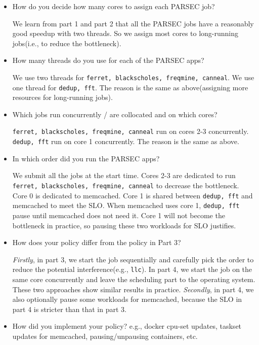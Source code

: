 \documentclass[11pt]{article}
\begin{document}
\begin{enumerate}
\begin{itemize}
        \item How do you decide how many cores to assign each PARSEC job? 

        We learn from part 1 and part 2 that all the PARSEC jobs have a reasonably good speedup
        with two threads. So we assign most cores to long-running jobs(i.e., to reduce the bottleneck).

        \item How many threads do you use for each of the PARSEC apps? 

        We use two threads for \texttt{ferret, blackscholes, freqmine, canneal}. 
        We use one thread for \texttt{dedup, fft}. The reason is the same as above(assigning more resources for long-running jobs).
        \item Which jobs run concurrently / are collocated and on which cores? 
       
       \texttt{ferret, blackscholes, freqmine, canneal} run on cores 2-3 concurrently.
       \texttt{dedup, fft} run on core 1 concurrently. The reason is the same as above.

        \item In which order did you run the PARSEC apps? 

        We submit all the jobs at the start time. Cores 2-3 are dedicated to run \texttt{ferret, blackscholes, freqmine, canneal} to decrease the bottleneck.
        Core 0 is dedicated to memcached. Core 1 is shared between \texttt{dedup, fft} and memcached to meet the SLO.
        When memcached uses core 1, \texttt{dedup, fft} pause until memcached does not need it.
        Core 1 will not become the bottleneck in practice, so pausing these two workloads for SLO justifies. 

        \item How does your policy differ from the policy in Part 3? 

        \emph{Firstly}, in part 3, we start the job sequentially and carefully pick the order to reduce the potential interference(e.g., \texttt{llc}).
        In part 4, we  start the job on the same core concurrently and leave the scheduling part to the operating system.
        These two approaches show similar results in practice. 
        \emph{Secondly}, in part 4, we also optionally pause some workloads for memcached, because the SLO in part 4 is stricter than that in part 3.


        \item How did you implement your policy? e.g., docker cpu-set updates, taskset updates for memcached, pausing/unpausing containers, etc.
        

\end{itemize}
\end{enumerate}
\end{document}
